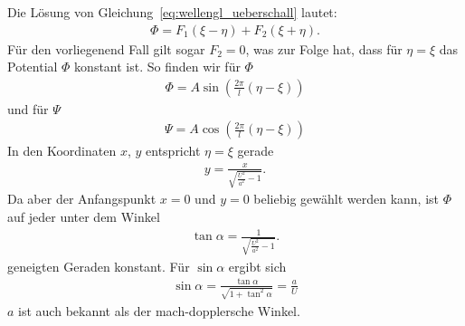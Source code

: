 Die Lösung von Gleichung~\ref{eq:wellengl_ueberschall} lautet:
\begin{align*}
    \Phi
    =
    F_1(\xi-\eta)
    +
    F_2(\xi+\eta).
\end{align*}
Für den vorliegenend Fall gilt sogar $F_2 = 0$, 
was zur Folge hat, dass für $\eta = \xi$ das Potential
$\Phi$ konstant ist.
So finden wir für $\Phi$
\begin{align*}
    \Phi
    =
    A \sin\left(
        \frac{2\pi}{l}
        (\eta-\xi)
    \right)
\end{align*}
und für $\Psi$
\begin{align*}
    \Psi
    =
    A \cos\left(
        \frac{2\pi}{l}
        (\eta-\xi)
    \right)
\end{align*}
In den Koordinaten $x$, $y$ entspricht $\eta = \xi$ gerade 
\begin{align*}
    y
    =
    \frac{x}{\sqrt{\frac{U^2}{a^2}-1}}.
\end{align*} 
Da aber der Anfangspunkt $x = 0$ und $y = 0$ beliebig gewählt
werden kann, ist $\Phi$ auf jeder unter dem Winkel
\begin{align*}
    \tan \alpha
    =
    \frac{1}{\sqrt{\frac{U^2}{a^2}-1}}.
\end{align*}
geneigten Geraden konstant.
Für $\sin \alpha$ ergibt sich
\begin{align*}
    \sin \alpha
    =
    \frac{\tan \alpha}{\sqrt{1 + \tan^2 \alpha}}
    =
    \frac{a}{U}
\end{align*}
$a$ ist auch bekannt als der mach-dopplersche Winkel.


